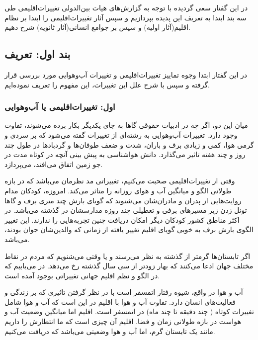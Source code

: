 در این گفتار سعی گردیده با توجه به گزارش‌های هیات بین‌الدولی تغییرات‌اقلیمی 
طی سه بند ابتدا به تعریف این پدیده بپردازیم و سپس آثار تغییرات‌اقلیمی را ابتدا بر نظام اقلیم(آثار اولیه) و سپس بر جوامع انسانی(آثار ثانویه) شرح دهیم.









	\subsection*{بند اول: تعریف}
	در این گفتار ابتدا وجوه تماییز تغییرات‌اقلیمی و تغییرات آب‌و‌هوایی مورد بررسی قرار گرفته و سپس با شرح علل این تغییرات، این مفهوم را تعریف نموده‌ایم.


		\subsubsection*{ اول: تغییرات‌اقلیمی یا آب‌و‌هوایی}
		میان این دو، اگر چه در ادبیات حقوقی گاها به جای یکدیگر بکار برده می‌شوند، تفاوت وجود دارد. تغییرات آب‌و‌هوایی به رشته‌ای از تغییرات گفته می‌شود که بر سردی و گرمی هوا، کمی و زیادی برف و باران، شدت و ضعف طوفان‌ها و گرد‌باد‌ها در طول چند روز و چند هفته تاثیر می‌گذارد. دانش هواشناسی به پیش بینی آنچه در کوتاه مدت در جو زمین اتفاق می‌افتد، می‌پردازد. 
		
		وقتی از تغییرات‌اقلیمی صحبت می‌کنیم، تغییراتی مد نظرمان می‌باشد که در بازه طولانی الگو و میانگین آب و هوای روزانه را متاثر می‌کند. امروزه، کودکان مدام روایت‌هایی از پدران و مادران‌شان می‌شنوند که گویای بارش چند متری برف و گاها تونل زدن زیر مسیر‌های برفی و تعطیلی چند روزه مدارسشان در گذشته می‌باشد. در اکثر مناطق کشور کودکان دیگر امکان دریافت چنین تجربه‌هایی را ندارند. این تغییر الگوی بارش برف به خوبی گویای اقلیم تغییر یافته از زمانی که والدین‌شان جوان بودند، می‌باشد. 
		
		اگر تابستان‌ها گرمتر از گذشته به نظر می‌رسند و یا وقتی می‌شنویم که مردم در نقاط مختلف جهان ادعا می‌کنند که بهار زودتر از سی سال گذشته رخ می‌دهد. در می‌یابیم که در الگو و نظم اقلیم جهانی تغییراتی بوجود آمده است.
		
		آب و هوا در واقع، شیوه رفتار اتمسفر است با در نظر گرفتن تاثیری که بر زندگی و فعالیت‌های انسان دارد. تفاوت آب و هوا با اقلیم در این است که آب و هوا شامل تغییرات کوتاه ( چند دقیقه تا چند ماه) در اتمسفر است. اقلیم اما میانگین وضعیت آب و هواست در بازه طولانی زمان و فضا. اقلیم آن چیزی است که ما انتظارش را داریم مانند یک تابستان گرم، اما آب و هوا وضعیتی می‌باشد که دریافت می‌کنیم.  















